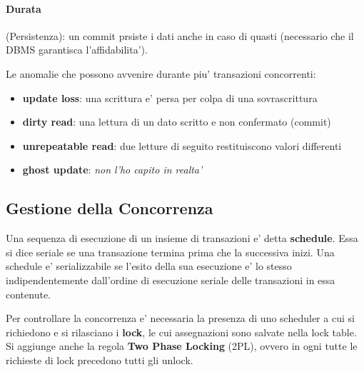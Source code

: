 \paragraph{Durata} (Persistenza): un commit prsiste i dati anche in caso di quasti (necessario che il DBMS garantisca l'affidabilita').

Le anomalie che possono avvenire durante piu' transazioni concorrenti:

\begin{itemize}
  \item \textbf{update loss}: una scrittura e' persa per colpa di una sovrascrittura
  \item \textbf{dirty read}: una lettura di un dato scritto e non confermato (commit)
  \item \textbf{unrepeatable read}: due letture di seguito restituiscono valori differenti
  \item \textbf{ghost update}: \textit{non l'ho capito in realta'}
\end{itemize}


\subsection{Gestione della Concorrenza}

Una sequenza di esecuzione di un insieme di transazioni e' detta \textbf{schedule}. Essa si dice seriale se una transazione termina prima che la successiva inizi.
Una schedule e' serializzabile se l'esito della sua esecuzione e' lo stesso indipendentemente dall'ordine di esecuzione seriale delle transazioni in essa contenute.

Per controllare la concorrenza e' necessaria la presenza di uno scheduler a cui si richiedono e si rilasciano i \textbf{lock}, le cui assegnazioni sono salvate nella lock table.
Si aggiunge anche la regola \textbf{Two Phase Locking} (2PL), ovvero in ogni tutte le richieste di lock precedono tutti gli unlock.
